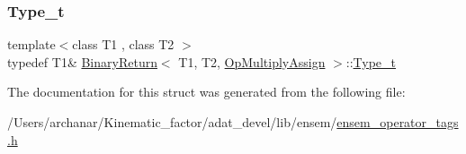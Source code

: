 \mbox{\label{structBinaryReturn_3_01T1_00_01T2_00_01OpMultiplyAssign_01_4_a87fa61c2114e9aa9f0550dc271144d42}} 
\subsubsection{\texorpdfstring{Type\_t}{Type\_t}\hspace{0.1cm}{\footnotesize\ttfamily [2/2]}}
{\footnotesize\ttfamily template$<$class T1 , class T2 $>$ \\
typedef T1\& \mbox{\hyperlink{structBinaryReturn}{Binary\+Return}}$<$ T1, T2, \mbox{\hyperlink{structOpMultiplyAssign}{Op\+Multiply\+Assign}} $>$\+::\mbox{\hyperlink{structBinaryReturn_3_01T1_00_01T2_00_01OpMultiplyAssign_01_4_a87fa61c2114e9aa9f0550dc271144d42}{Type\+\_\+t}}}



The documentation for this struct was generated from the following file\+:\begin{DoxyCompactItemize}
\item 
/\+Users/archanar/\+Kinematic\+\_\+factor/adat\+\_\+devel/lib/ensem/\mbox{\hyperlink{lib_2ensem_2ensem__operator__tags_8h}{ensem\+\_\+operator\+\_\+tags.\+h}}\end{DoxyCompactItemize}
